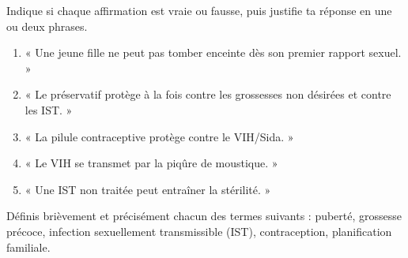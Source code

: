 \documentclass[11pt]{article}
\newcommand{\cle}[1]{{\popxbold\color{popdark}#1}}
\begin{document}
\begin{exercice}
Indique si chaque affirmation est vraie ou fausse, puis justifie ta réponse en une ou deux phrases.
\begin{enumerate}
\item « Une jeune fille ne peut pas tomber enceinte dès son premier rapport sexuel. »
\item « Le préservatif protège à la fois contre les grossesses non désirées et contre les IST. »
\item « La pilule contraceptive protège contre le VIH/Sida. »
\item « Le VIH se transmet par la piqûre de moustique. »
\item « Une IST non traitée peut entraîner la stérilité. »
\end{enumerate}
\end{exercice}

\begin{exercice}[Définitions]
Définis brièvement et précisément chacun des termes suivants : \cle{puberté}, \cle{grossesse précoce}, \cle{infection sexuellement transmissible (IST)}, \cle{contraception}, \cle{planification familiale}.
\end{exercice}
\end{document}
